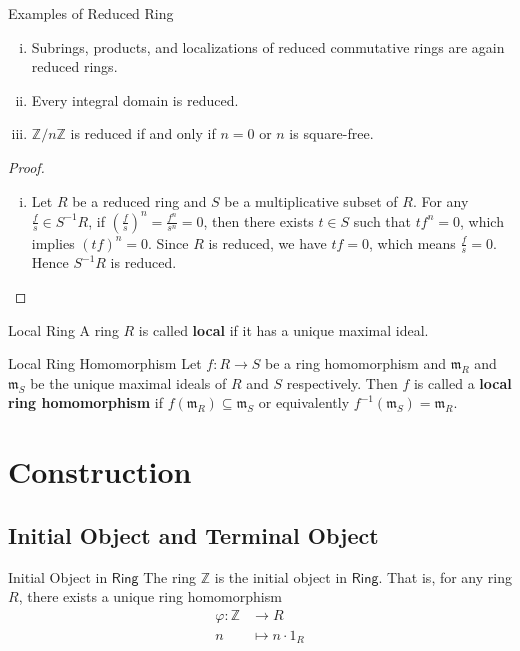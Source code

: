 \begin{proposition}{Examples of Reduced Ring}{}
    \begin{enumerate}[(i)]
        \item Subrings, products, and localizations of reduced commutative rings are again reduced rings.
        \item Every integral domain is reduced.
        \item $\mathbb{Z}/n\mathbb{Z}$ is reduced if and only if $n=0$ or $n$ is square-free.
    \end{enumerate}
\end{proposition}
\begin{proof}
    \begin{enumerate}[(i)]
        \item Let $R$ be a reduced ring and $S$ be a  multiplicative subset of $R$. For any $\frac{f}{s}\in S^{-1}R$, if $\left(\frac{f}{s}\right)^n=\frac{f^n}{s^n}=0$, then there exists $t\in S$ such that $tf^n=0$, which implies $(tf)^n=0$. Since $R$ is reduced, we have $tf=0$, which means $\frac{f}{s}=0$. Hence $S^{-1}R$ is reduced.
    \end{enumerate}
\end{proof}


\begin{definition}{Local Ring}{}
    A ring $R$ is called \textbf{local} if it has a unique maximal ideal.
\end{definition}

\begin{definition}{Local Ring Homomorphism}{}
    Let $f:R\to S$ be a ring homomorphism and $\mathfrak{m}_R$ and $\mathfrak{m}_S$ be the unique maximal ideals of $R$ and $S$ respectively. Then $f$ is called a \textbf{local ring homomorphism} if $f(\mathfrak{m}_R)\subseteq \mathfrak{m}_S$ or equivalently $f^{-1}(\mathfrak{m}_S)=\mathfrak{m}_R$.
\end{definition}

\section{Construction}
\subsection{Initial Object and Terminal Object}
\begin{proposition}{Initial Object in $\mathsf{Ring}$}{}
    The ring $\mathbb{Z}$ is the initial object in $\mathsf{Ring}$. That is, for any ring $R$, there exists a unique ring homomorphism
    \begin{align*}
        \varphi:\mathbb{Z}&\longrightarrow R\\
        n&\longmapsto n\cdot 1_R
    \end{align*}
\end{proposition}

